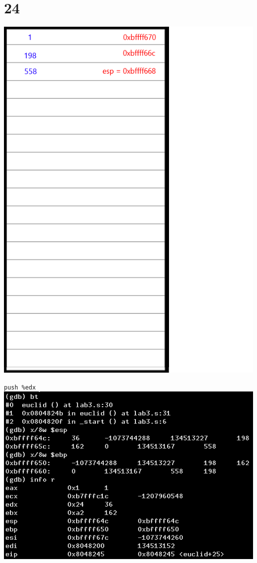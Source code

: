 \documentclass{article}
\begin{document}
\section*{24}
\begin{minipage}{5cm}
\includegraphics[scale=0.3]{s3.png}
\end{minipage}
\begin{minipage}{8cm}
\verb|push %edx|\\
\includegraphics[scale=0.4]{bxi24.png} \\
\end{minipage}
\clearpage
\end{document}

